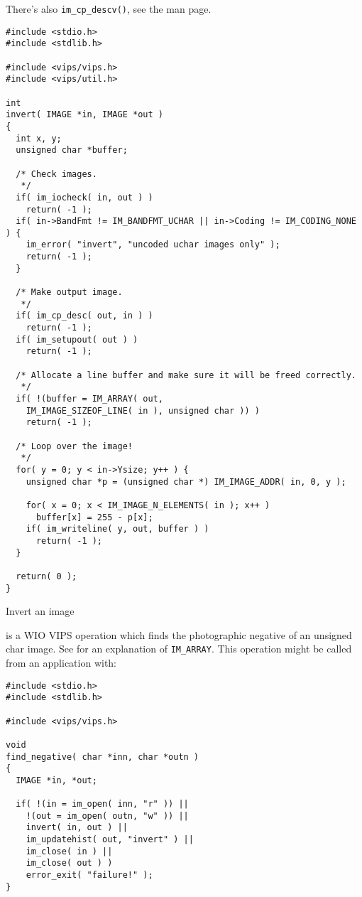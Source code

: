 \noindent
There's also \verb+im_cp_descv()+, see the man page.

\begin{fig2}
\begin{verbatim}
#include <stdio.h>
#include <stdlib.h>

#include <vips/vips.h>
#include <vips/util.h>

int
invert( IMAGE *in, IMAGE *out )
{
  int x, y;
  unsigned char *buffer;

  /* Check images.
   */
  if( im_iocheck( in, out ) )
    return( -1 );
  if( in->BandFmt != IM_BANDFMT_UCHAR || in->Coding != IM_CODING_NONE ) {
    im_error( "invert", "uncoded uchar images only" );
    return( -1 );
  }

  /* Make output image.
   */
  if( im_cp_desc( out, in ) )
    return( -1 );
  if( im_setupout( out ) )
    return( -1 );

  /* Allocate a line buffer and make sure it will be freed correctly.
   */
  if( !(buffer = IM_ARRAY( out, 
    IM_IMAGE_SIZEOF_LINE( in ), unsigned char )) )
    return( -1 );

  /* Loop over the image!
   */
  for( y = 0; y < in->Ysize; y++ ) {
    unsigned char *p = (unsigned char *) IM_IMAGE_ADDR( in, 0, y );

    for( x = 0; x < IM_IMAGE_N_ELEMENTS( in ); x++ )
      buffer[x] = 255 - p[x];
    if( im_writeline( y, out, buffer ) )
      return( -1 );
  }

  return( 0 );
}
\end{verbatim}
\caption{Invert an image}
\label{fg:invert}
\end{fig2}

 is a WIO VIPS operation which finds the photographic
negative of an unsigned char image. See  for an explanation
of \verb+IM_ARRAY+. This operation might be called from an
application with:

\begin{verbatim}
#include <stdio.h>
#include <stdlib.h>

#include <vips/vips.h>

void
find_negative( char *inn, char *outn )
{
  IMAGE *in, *out;

  if( !(in = im_open( inn, "r" )) ||
    !(out = im_open( outn, "w" )) ||
    invert( in, out ) ||
    im_updatehist( out, "invert" ) ||
    im_close( in ) || 
    im_close( out ) )
    error_exit( "failure!" );
}
\end{verbatim}

